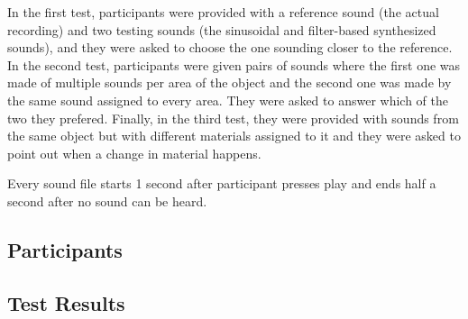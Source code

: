 In the first test, participants were provided with a reference sound (the actual recording) and two testing sounds (the sinusoidal and filter-based synthesized sounds), and they were asked to choose the one sounding closer to the reference. In the second test, participants were given pairs of sounds where the first one was made of multiple sounds per area of the object and the second one was made by the same sound assigned to every area. They were asked to answer which of the two they prefered. Finally, in the third test, they were provided with sounds from the same object but with different materials assigned to it and they were asked to point out when a change in material happens. 

Every sound file starts 1 second after participant presses play and ends half a second after no sound can be heard.

\subsection{Participants}

\subsection{Test Results}
